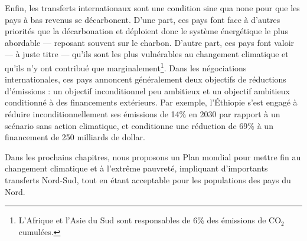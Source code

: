 \documentclass[a5paper,french]{memoir}
\begin{document}

Enfin, les transferts internationaux sont une condition sine qua none pour que les pays à bas revenus se décarbonent. D'une part, ces pays font face à d'autres priorités que la décarbonation et déploient donc le système énergétique le plus abordable --- reposant souvent sur le charbon. D'autre part, ces pays font valoir --- à juste titre --- qu'ils sont les plus vulnérables au changement climatique et qu'ils n'y ont contribué que marginalement\footnote{L'Afrique et l'Asie du Sud sont responsables de 6\% des émissions de CO$_\text{2}$ cumulées. %
}. Dans les négociations internationales, ces pays annoncent généralement deux objectifs de réductions d'émissions : un objectif inconditionnel peu ambitieux et un objectif ambitieux conditionné à des financements extérieurs. Par exemple, l'Éthiopie s'est engagé à réduire inconditionnellement ses émissions de 14\% en 2030 par rapport à un scénario sans action climatique, et conditionne une réduction de 69\% à un financement de 250 milliards de dollar. %

Dans les prochains chapitres, nous proposons un Plan mondial pour mettre fin au changement climatique et à l'extrême pauvreté, impliquant d'importants transferts Nord-Sud, tout en étant acceptable pour les populations des pays du Nord.

\end{document}
